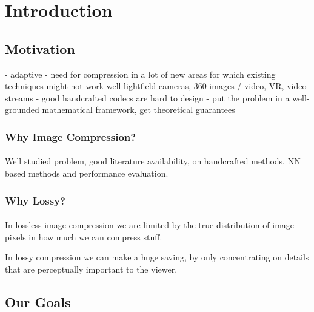 \documentclass{article}
\begin{document}
\newpage

\tableofcontents

\newpage

%
%

\section{Introduction}
\subsection{Motivation}
- adaptive
- need for compression in a lot of new areas for which existing techniques might
not work well
lightfield cameras, 360 images / video, VR, video streams
- good handcrafted codecs are hard to design
- put the problem in a well-grounded mathematical framework, get theoretical guarantees

\subsubsection{Why Image Compression?}
\paragraph{}
Well studied problem, good literature availability, on handcrafted methods, NN
based methods and performance evaluation.

\subsubsection{Why Lossy?}
\paragraph{}
In lossless image compression we are limited by the true distribution of image
pixels in how much we can compress stuff.

In lossy compression we can make a huge saving, by only concentrating on details
that are perceptually important to the viewer.

\subsection{Our Goals}
\end{document}
